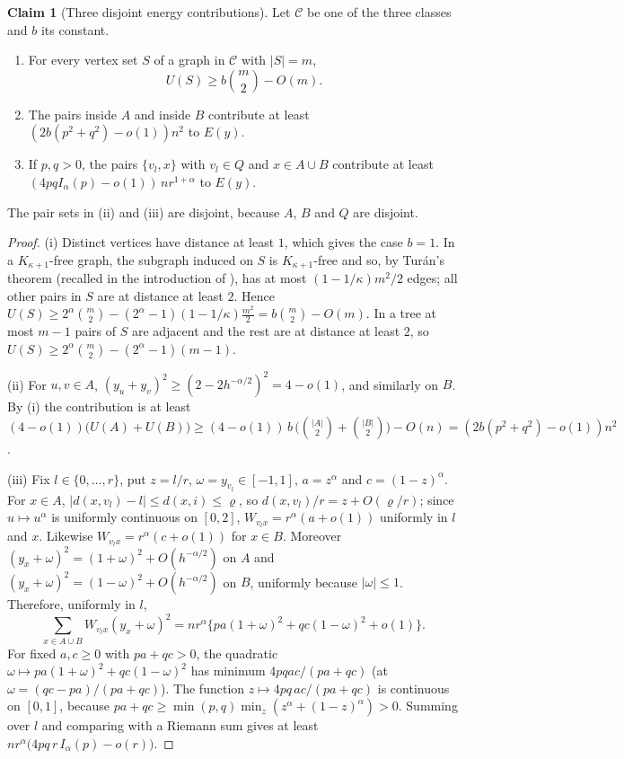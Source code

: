 \documentclass[11pt,a4paper]{article}
\theoremstyle{definition}
\newtheorem{claim}{Claim}
\begin{document}
\begin{claim}[Three disjoint energy contributions]\label{cl:energy}
Let $\mathcal C$ be one of the three classes and $b$ its constant.
\begin{enumerate}
\item[(i)] For every vertex set $S$ of a graph in $\mathcal C$ with $|S|=m$,
\begin{equation}\label{eq:intra}
 U(S)\ge b\binom m2-O(m).
\end{equation}
\item[(ii)] The pairs inside $A$ and inside $B$ contribute at least $(2b(p^2+q^2)-o(1))n^2$ to $E(y)$.
\item[(iii)] If $p,q>0$, the pairs $\{v_l,x\}$ with $v_l\in Q$ and $x\in A\cup B$ contribute at least $(4pqI_\alpha(p)-o(1))\,nr^{1+\alpha}$ to $E(y)$.
\end{enumerate}
The pair sets in (ii) and (iii) are disjoint, because $A$, $B$ and $Q$ are disjoint.
\end{claim}
\begin{proof}
(i) Distinct vertices have distance at least $1$, which gives the case $b=1$. In a $K_{\kappa+1}$-free graph, the subgraph induced on $S$ is $K_{\kappa+1}$-free and so, by Tur\'an's theorem (recalled in the introduction of \cite{es}), has at most $(1-1/\kappa)m^2/2$ edges; all other pairs in $S$ are at distance at least $2$. Hence $U(S)\ge2^\alpha\binom m2-(2^\alpha-1)(1-1/\kappa)\frac{m^2}2=b\binom m2-O(m)$. In a tree at most $m-1$ pairs of $S$ are adjacent and the rest are at distance at least $2$, so $U(S)\ge2^\alpha\binom m2-(2^\alpha-1)(m-1)$.

(ii) For $u,v\in A$, $(y_u+y_v)^2\ge(2-2h^{-\alpha/2})^2=4-o(1)$, and similarly on $B$. By (i) the contribution is at least $(4-o(1))\big(U(A)+U(B)\big)\ge(4-o(1))\,b\,\big(\binom{|A|}2+\binom{|B|}2\big)-O(n)=(2b(p^2+q^2)-o(1))n^2$.

(iii) Fix $l\in\{0,\dots,r\}$, put $z=l/r$, $\omega=y_{v_l}\in[-1,1]$, $a=z^\alpha$ and $c=(1-z)^\alpha$. For $x\in A$, $|d(x,v_l)-l|\le d(x,i)\le\varrho$, so $d(x,v_l)/r=z+O(\varrho/r)$; since $u\mapsto u^\alpha$ is uniformly continuous on $[0,2]$, $W_{v_lx}=r^\alpha(a+o(1))$ uniformly in $l$ and $x$. Likewise $W_{v_lx}=r^\alpha(c+o(1))$ for $x\in B$. Moreover $(y_x+\omega)^2=(1+\omega)^2+O(h^{-\alpha/2})$ on $A$ and $(y_x+\omega)^2=(1-\omega)^2+O(h^{-\alpha/2})$ on $B$, uniformly because $|\omega|\le1$. Therefore, uniformly in $l$,
\[
 \sum_{x\in A\cup B}W_{v_lx}(y_x+\omega)^2=nr^\alpha\big\{pa(1+\omega)^2+qc(1-\omega)^2+o(1)\big\}.
\]
For fixed $a,c\ge0$ with $pa+qc>0$, the quadratic $\omega\mapsto pa(1+\omega)^2+qc(1-\omega)^2$ has minimum $4pqac/(pa+qc)$ (at $\omega=(qc-pa)/(pa+qc)$). The function $z\mapsto 4pq\,ac/(pa+qc)$ is continuous on $[0,1]$, because $pa+qc\ge\min(p,q)\min_z(z^\alpha+(1-z)^\alpha)>0$. Summing over $l$ and comparing with a Riemann sum gives at least $nr^\alpha\big(4pq\,r\,I_\alpha(p)-o(r)\big)$.
\end{proof}
\end{document}
